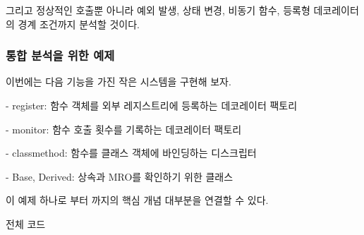 그리고 정상적인 호출뿐 아니라 예외 발생, 상태 변경, 비동기 함수, 등록형 데코레이터의 경계 조건까지 분석할 것이다.

\subsubsection{통합 분석을 위한 예제}

이번에는 다음 기능을 가진 작은 시스템을 구현해 보자.

\begin{dhksmry}
- register: 함수 객체를 외부 레지스트리에 등록하는 데코레이터 팩토리

- monitor: 함수 호출 횟수를 기록하는 데코레이터 팩토리

- classmethod: 함수를 클래스 객체에 바인딩하는 디스크립터

- Base, Derived: 상속과 MRO를 확인하기 위한 클래스
\end{dhksmry}

이 예제 하나로 부터 까지의 핵심 개념 대부분을 연결할 수 있다.

\begin{dhknote}
\begin{dhksmry}[centered]
전체 코드
\end{dhksmry}
\end{dhknote}

